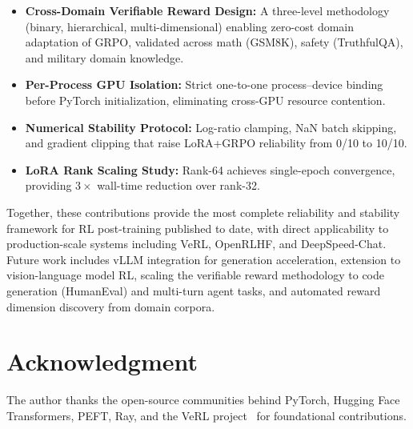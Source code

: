 \documentclass{ieeeaccess}
\begin{document}
\begin{itemize}
\item \textbf{Cross-Domain Verifiable Reward Design:}
  A three-level methodology (binary, hierarchical, multi-dimensional)
  enabling zero-cost domain adaptation of GRPO, validated across
  math (GSM8K), safety (TruthfulQA), and military domain knowledge.

\item \textbf{Per-Process GPU Isolation:}
  Strict one-to-one process--device binding before PyTorch initialization,
  eliminating cross-GPU resource contention.

\item \textbf{Numerical Stability Protocol:}
  Log-ratio clamping, NaN batch skipping, and gradient clipping that
  raise LoRA+GRPO reliability from 0/10 to 10/10.

\item \textbf{LoRA Rank Scaling Study:}
  Rank-64 achieves single-epoch convergence, providing $3\times$
  wall-time reduction over rank-32.
\end{itemize}

Together, these contributions provide the most complete reliability and stability framework
for RL post-training published to date, with direct applicability to
production-scale systems including VeRL, OpenRLHF, and DeepSpeed-Chat.
Future work includes vLLM integration for generation acceleration,
extension to vision-language model RL, scaling the verifiable reward
methodology to code generation (HumanEval) and multi-turn agent tasks,
and automated reward dimension discovery from domain corpora.

\section*{Acknowledgment}
The author thanks the open-source communities behind PyTorch, Hugging Face Transformers,
PEFT, Ray, and the VeRL project~\cite{sheng2024hybridflow} for foundational contributions.
\end{document}
